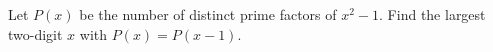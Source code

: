 Let $P(x)$ be the number of distinct prime factors of $x^2-1$. Find the largest two-digit $x$ with $P(x)=P(x-1)$.

